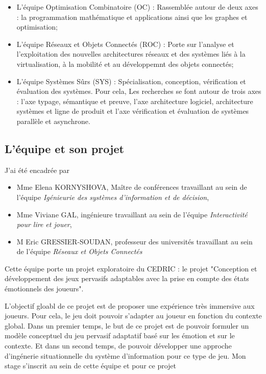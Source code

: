 \documentclass{article}
\begin{document}
\begin{itemize}
			\item L'équipe Optimisation Combinatoire (OC) : Rassemblée autour de deux axes : la programmation mathématique et applications ainsi que les graphes et optimisation;
			\item L'équipe Réseaux et Objets Connectés (ROC) : Porte sur l'analyse et l'exploitation des nouvelles architectures réseaux et des systèmes liés à la virtualisation, à la mobilité et au développemnt des objets connectés;
			\item L'équipe Systèmes Sûrs (SYS) : Spécialisation, conception, vérification et évaluation des systèmes. Pour cela, Les recherches se font autour de trois axes : l'axe typage, sémantique et preuve, l'axe architecture logiciel, architecture systèmes et ligne de produit et l'axe vérification  et évaluation de systèmes parallèle et asynchrone.
		\end{itemize}
	\subsection{L'équipe et son projet}
		J'ai été encadrée par 
		\begin{itemize}
			\item Mme Elena KORNYSHOVA, Maître de conférences travaillant au sein de l'équipe \textit{Igénieurie des systèmes d'information et de décision}, 
			\item Mme Viviane GAL, ingénieure travaillant au sein de l'équipe \textit{Interactivité pour lire et jouer},
			\item M Eric GRESSIER-SOUDAN, professeur des universités travaillant au sein de l'équipe \textit{Réseaux et Objets Connectés}
		\end{itemize}
		Cette équipe porte un projet exploratoire du CEDRIC : le projet "Conception et développement des jeux pervasifs adaptables avec la prise en compte des états émotionnels des joueurs".\par
		L'objectif gloabl de ce projet est de proposer une expérience très immersive aux joueurs. Pour cela, le jeu doit pouvoir s'adapter au joueur en fonction du contexte global.
		Dans un premier temps, le but de ce projet est de pouvoir formuler un modèle conceptuel du jeu pervasif adaptatif basé sur les émotion et sur le contexte. Et dans un second temps, de pouvoir développer une approche d'ingénerie situationnelle du système d'information pour ce type de jeu.\newline
		Mon stage s'inscrit au sein de cette équipe et pour ce projet 
\end{document}
